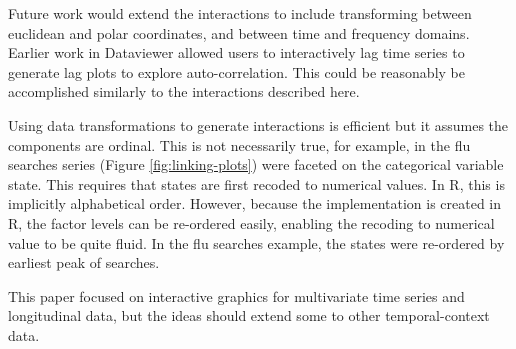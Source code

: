 \documentclass[12pt]{article}
\begin{document}
Future work would extend the interactions to include transforming between euclidean and polar coordinates, and between time and frequency domains. Earlier work in Dataviewer \citep{BAHM88} allowed users to interactively lag time series to generate lag plots to explore auto-correlation. This could be reasonably be accomplished similarly to the interactions described here.


Using data transformations to generate interactions is efficient but it assumes the components are ordinal. This is not necessarily true, for example, in the flu searches series (Figure \ref{fig:linking-plots}) were faceted on the categorical variable state. This requires that states are first recoded to numerical values. In R, this is implicitly alphabetical order. However, because the implementation is created in R, the factor levels can be re-ordered easily, enabling the recoding to numerical value to be quite fluid. In the flu searches example, the states were re-ordered by earliest peak of searches.

This paper focused on interactive graphics for multivariate time series and longitudinal data, but the ideas should extend some to other temporal-context data.


\end{document}

